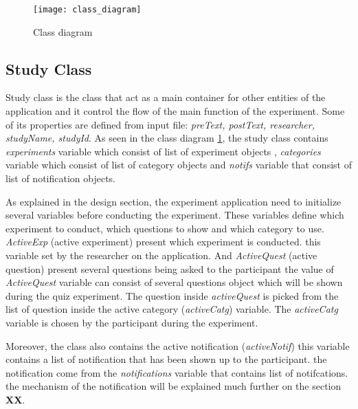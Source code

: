 \begin{figure}
\begin{center}
\texttt{[image: class\_diagram]}
\end{center}
\caption{Class diagram}
\label{fig:class_diagram}
\end{figure}

\subsection{Study Class}
Study class is the class that act as a main container for other entities of the application and it control the flow of the main function of the experiment.
Some of its properties are defined from input file: \textit{preText, postText, researcher, studyName, studyId}.
As seen in the class diagram \ref{fig:class_diagram}, the study class contains \textit{experiments} variable which consist of list of experiment objects
, \textit{categories} variable which consist of list of category objects and \textit{notifs} variable that consist of list of notification objects.

As explained in the design section, the experiment application need to initialize several variables before conducting the experiment. These variables define which experiment to conduct, which questions to show and which category to use. \textit{ActiveExp} (active experiment) present which experiment is conducted. this variable set by the researcher on the application. And \textit{ActiveQuest} (active question) present several  questions being asked to the participant the value of \textit{ActiveQuest} variable can consist of several questions object which will be shown during the quiz experiment. The question inside \textit{activeQuest} is picked from the list of question inside the active category (\textit{activeCatg}) variable. The \textit{activeCatg} variable is chosen by the participant during the experiment.



Moreover, the class also contains the active notification (\textit{activeNotif}) this variable contains a list of notification that has been shown up to the participant. the notification come from the \textit{notifications} variable that contains list of notifcations.  the mechanism of the notification will be explained much further on the section \textbf{XX}.

